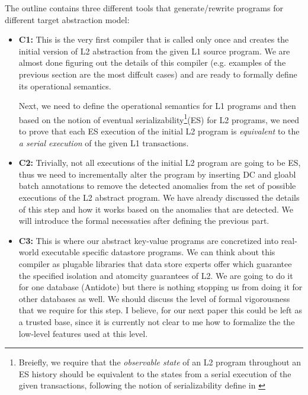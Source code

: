 \documentclass[12pt,letter]{article}
\begin{document}
The outline contains three different tools that generate/rewrite programs for
different target abstraction model: 
\begin{itemize}
	\item {\bf C1:} This is the very first compiler that is called only once
		and creates the initial version of L2 abstraction from the given
		L1 source program. We are almost done figuring out the details
		of this compiler (e.g. examples of the previous section are the
		most diffcult cases) and are ready to formally define 
		its operational semantics. 
		
		Next, we need to  define
		the operational semantics for L1 programs  and then based on the notion of eventual
		serializability\footnote{Breiefly, we require that the \emph{observable
		state} of
		an L2 program throughout an ES
		history should be equivalent to the states from a serial execution
	of the given transactions, following the notion of serializability
define in \cite{serforEC}}(ES) for
		L2 programs, we need to  
		prove that each ES execution of the initial L2 program is 
		\emph{equivalent} to the \emph{a serial execution} of
				the given L1 transactions. 	
	\item {\bf C2:} Trivially, not all executions of the initial L2 program are going
		to be ES, thus we need to incrementally alter the program by
		inserting DC and gloabl batch annotations to remove the detected
		anomalies from the set of possible executions of the L2 abstract
		program. We have already discussed the details of this step and
		how it works based on the anomalies that are detected. We will
		introduce the formal necessaties after defining the previous
		part.
	\item {\bf C3:} This is where our abstract key-value programs are
		concretized into real-world executable specific datastore
		programs. We can think about this compiler as plugable libraries
		that data store experts offer which guarantee the specified
		isolation and atomcity guarantees of L2. We are going to do it
		for one database (Antidote) but there is nothing stopping us
		from doing it for other databases as well. 
		We should discuss the level of formal vigorousness that we require 
		for this step. I believe, for our next paper this could be left 
		as a trusted base, since it is currently not clear to me how to formalize 
		the the low-level features used at this level. 


\end{itemize}















\end{document}
